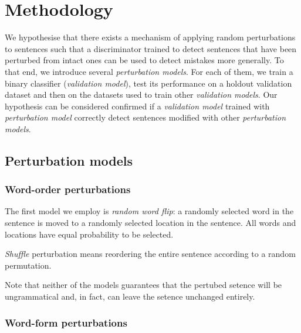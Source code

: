 \documentclass[11pt,a4paper]{article}
\begin{document}



\section{Methodology}
\label{sec:methodology}

We hypothesise that there exists a mechanism of applying random perturbations to sentences such that a discriminator trained to detect sentences that have been perturbed from intact ones can be used to detect mistakes more generally.
To that end, we introduce several \emph{perturbation models}.
For each of them, we train a binary classifier (\emph{validation model}), test its performance on a holdout validation dataset and then on the datasets used to train other \emph{validation models}.
Our hypothesis can be considered confirmed if a \emph{validation model} trained with \emph{perturbation model} correctly detect sentences modified with other \emph{perturbation models}.

\subsection{Perturbation models}

\begin{figure}
\end{figure}

\subsubsection{Word-order perturbations}

The first model we employ is \emph{random word flip}: a randomly selected word in the sentence is moved to a randomly selected location in the sentence.
All words and locations have equal probability to be selected.

\emph{Shuffle} perturbation means reordering the entire sentence according to a random permutation.

Note that neither of the models guarantees that the pertubed setence will be ungrammatical and, in fact, can leave the setence unchanged entirely.

\subsubsection{Word-form perturbations}
\end{document}
